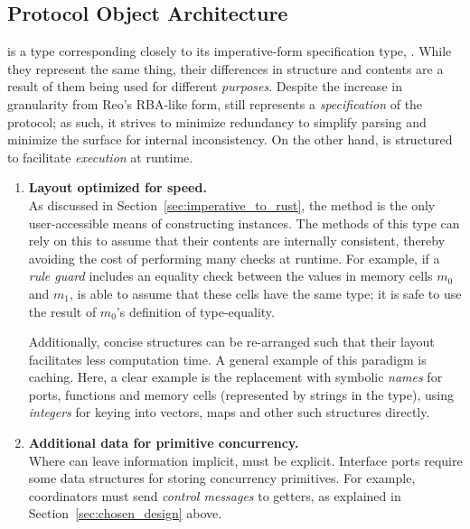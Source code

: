 \subsection{Protocol Object Architecture}
\label{sec:protocol_object_architecture}
 is a type corresponding closely to its imperative-form specification type, . While they represent the same thing, their differences in structure and contents are a result of them being used for different \textit{purposes}. Despite the increase in granularity from Reo's RBA-like form,  still represents a \textit{specification} of the protocol; as such, it strives to minimize redundancy to simplify parsing and minimize the surface for internal inconsistency. On the other hand,  is structured to facilitate \textit{execution} at runtime.

\begin{enumerate}
	\item \textbf{Layout optimized for speed.}\\
	As discussed in Section~\ref{sec:imperative_to_rust}, the  method is the only user-accessible means of constructing  instances. The methods of this type can rely on this to assume that their contents are internally consistent, thereby avoiding the cost of performing many checks at runtime. For example, if a \textit{rule guard} includes an equality check between the values in memory cells $m_0$ and $m_1$,  is able to assume that these cells have the same type; it is safe to use the result of $m_0$'s definition of type-equality.
	
	Additionally, concise structures can be re-arranged such that their layout facilitates less computation time. A general example of this paradigm is caching. Here, a clear example is the replacement with symbolic \textit{names} for ports, functions and memory cells (represented by strings in the  type), using \textit{integers} for keying into vectors, maps and other such structures directly.
	
	\item \textbf{Additional data for primitive concurrency.}\\
	Where  can leave information implicit,  must be explicit. Interface ports require some data structures for storing concurrency primitives. For example, coordinators must send \textit{control messages} to getters, as explained in Section~\ref{sec:chosen_design} above. 
\end{enumerate}

